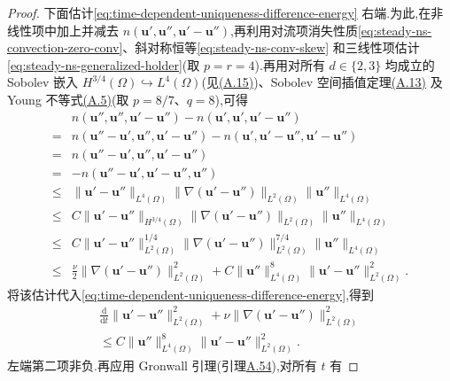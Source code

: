 \begin{lemma}[在更强正则性假设下弱解的唯一性]
\begin{proof}
下面估计\cref{eq:time-dependent-uniqueness-difference-energy} 右端.为此,在非线性项中加上并减去 $n(\bm{u}',\bm{u}'',\bm{u}'-\bm{u}'')$,再利用对流项消失性质\cref{eq:steady-ns-convection-zero-conv}、斜对称恒等\cref{eq:steady-ns-conv-skew} 和三线性项估计\cref{eq:steady-ns-generalized-holder}(取 $p=r=4$).再用对所有 $d\in\{2,3\}$ 均成立的 Sobolev 嵌入 $H^{3/4}(\Omega)\hookrightarrow L^4(\Omega)$(见\hyperref[eq:appendix-a-15]{(A.15)})、Sobolev 空间插值定理\hyperref[eq:appendix-a-13]{(A.13)} 及 Young 不等式\hyperref[eq:appendix-a-5]{(A.5)}(取 $p=8/7$、$q=8$),可得
\begin{equation}\label{eq:time-dependent-uniqueness-nonlinear-bound}
\begin{aligned}
  &n(\bm{u}'',\bm{u}'',\bm{u}'-\bm{u}'')
    -n(\bm{u}',\bm{u}',\bm{u}'-\bm{u}'')\\
  ={}&n(\bm{u}''-\bm{u}',\bm{u}'',\bm{u}'-\bm{u}'')
       -n(\bm{u}',\bm{u}'-\bm{u}'',\bm{u}'-\bm{u}'')\\
  ={}&n(\bm{u}''-\bm{u}',\bm{u}'',\bm{u}'-\bm{u}'')\\
  ={}&-n(\bm{u}''-\bm{u}',\bm{u}'-\bm{u}'',\bm{u}'')\\
  \le{}&\|\bm{u}'-\bm{u}''\|_{L^4(\Omega)}
          \|\nabla(\bm{u}'-\bm{u}'')\|_{L^2(\Omega)}
          \|\bm{u}''\|_{L^4(\Omega)}\\
  \le{}&C\|\bm{u}'-\bm{u}''\|_{H^{3/4}(\Omega)}
          \|\nabla(\bm{u}'-\bm{u}'')\|_{L^2(\Omega)}
          \|\bm{u}''\|_{L^4(\Omega)}\\
  \le{}&C\|\bm{u}'-\bm{u}''\|_{L^2(\Omega)}^{1/4}
          \|\nabla(\bm{u}'-\bm{u}'')\|_{L^2(\Omega)}^{7/4}
          \|\bm{u}''\|_{L^4(\Omega)}\\
  \le{}&\frac{\nu}{2}
          \|\nabla(\bm{u}'-\bm{u}'')\|_{L^2(\Omega)}^2
       +C\|\bm{u}''\|_{L^4(\Omega)}^8
          \|\bm{u}'-\bm{u}''\|_{L^2(\Omega)}^2.
\end{aligned}
\end{equation}
将该估计代入\cref{eq:time-dependent-uniqueness-difference-energy},得到
\begin{equation}\label{eq:time-dependent-uniqueness-gronwall}
\begin{gathered}
\frac{\mathrm{d}}{\mathrm{d}t}
     \|\bm{u}'-\bm{u}''\|_{L^2(\Omega)}^2
 +\nu\|\nabla(\bm{u}'-\bm{u}'')\|_{L^2(\Omega)}^2
 \\
 \le C\|\bm{u}''\|_{L^4(\Omega)}^8
        \|\bm{u}'-\bm{u}''\|_{L^2(\Omega)}^2.
\end{gathered}
\end{equation}
左端第二项非负.再应用 Gronwall 引理(引理\hyperref[lem:appendix-a-54]{A.54}),对所有 $t$ 有

\end{proof}
\end{lemma}
